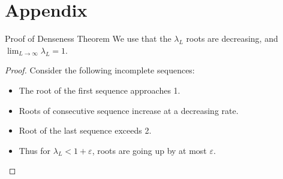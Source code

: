\documentclass[handout]{beamer}
\begin{document}
\section{Appendix}

\begin{frame}{Proof of Denseness Theorem}
We use that the $\lambda _{L}$ roots are decreasing, and $\lim_{L \rightarrow \infty }\lambda _{L}=1$.	
\pause
\begin{proof}
Consider the following incomplete sequences:
\begin{center}\end{center}
\pause
\begin{itemize}
\item
The root of the first sequence approaches 1. 
\item Roots of consecutive sequence increase at a decreasing rate. 
\item Root of the last sequence exceeds 2. 
\item Thus for $\lambda _{L}<1+\varepsilon $, roots are going up by at most $\varepsilon $. 
\end{itemize}
\end{proof}




\end{frame}
\end{document}
